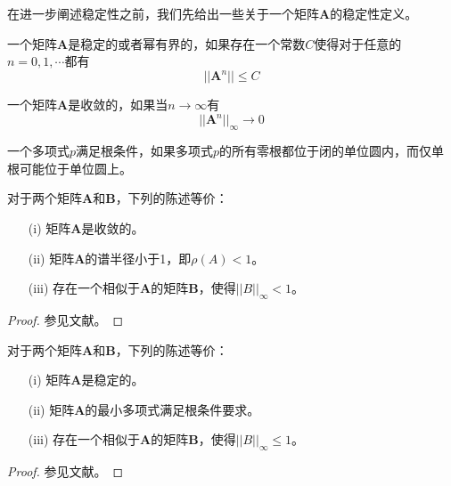 在进一步阐述稳定性之前，我们先给出一些关于一个矩阵$\bm{A}$的稳定性定义。%
\begin{definition}
一个矩阵$\bm{A}$是稳定的或者幂有界的\cite{Burrage1995a,Butcher2016a}，如果存在一个常数$C$使得对于任意的$n=0,1,\cdots$都有
\begin{equation}
||\bm{A}^n||\le C
\end{equation}
\end{definition}%
\begin{definition}[矩阵的收敛性]
一个矩阵$\bm{A}$是收敛的\cite{Burrage1995a,Butcher2016a}，如果当$n\to\infty$有
\begin{equation}
||\bm{A}^n||_{\infty}\to0
\end{equation}
\end{definition}%
\begin{definition}[多项式的根条件]
一个多项式$p$满足根条件\cite{Burrage1995a,LiShouFo2010a}，如果多项式$p$的所有零根都位于闭的单位圆内，而仅单根可能位于单位圆上。
\end{definition}%
\begin{theorem}[矩阵收敛的等价条件]
对于两个矩阵$\bm{A}$和$\bm{B}$，下列的陈述等价\cite{Burrage1995a,Butcher2016a}：\begin{itemize}
\item[(i)] 矩阵$\bm{A}$是收敛的。
\item[(ii)] 矩阵$\bm{A}$的谱半径小于1，即$\rho(A)<1$。
\item[(iii)] 存在一个相似于$\bm{A}$的矩阵$\bm{B}$，使得$||B||_{\infty}<1$。
\end{itemize}
\end{theorem}%
\begin{proof}
参见文献。
\end{proof}%
\begin{theorem}[矩阵稳定的等价条件]
对于两个矩阵$\bm{A}$和$\bm{B}$，下列的陈述等价\cite{Burrage1995a,Butcher2016a}：\begin{itemize}
\item[(i)] 矩阵$\bm{A}$是稳定的。
\item[(ii)] 矩阵$\bm{A}$的最小多项式满足根条件要求。
\item[(iii)] 存在一个相似于$\bm{A}$的矩阵$\bm{B}$，使得$||B||_{\infty}\le1$。
\end{itemize}
\end{theorem}%
\begin{proof}
参见文献。
\end{proof}

